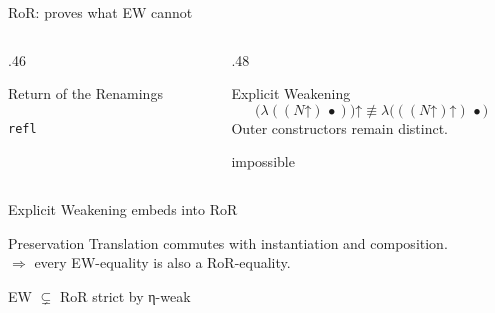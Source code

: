 \documentclass[pdftex,aspectratio=169]{beamer}
\newcommand{\refl}{\texttt{refl}}
\newcommand{\Blob}{\ensuremath{\bullet}}
\newcommand{\Wk}{\ensuremath{\mathord{\uparrow}}}
\begin{document}
\begin{frame}{RoR: proves what EW cannot}
  \begin{columns}[T,onlytextwidth]
    \begin{column}{.46\textwidth}
      \begin{block}{Return of the Renamings}
        \small
          \RoRWeakeningEta
      \end{block}
      \centering
      \Large\textcolor{alu-green}{\refl}
    \end{column}
    \begin{column}{.48\textwidth}
      \begin{alertblock}{Explicit Weakening}
        \[
        \bigl(\lambda((N\Wk)\,\Blob)\bigr)\Wk
        \not\equiv
        \lambda\bigl(((N\Wk)\Wk)\,\Blob\bigr)
        \]
        \small Outer constructors remain distinct.
      \end{alertblock}
      \centering
      \Large\textcolor{alu-red}{impossible}
    \end{column}
  \end{columns}

  \vspace{.75em}
\end{frame}

\begin{frame}{Explicit Weakening embeds into RoR}
  \begin{center}
  \end{center}

  \vspace{1em}
  \begin{block}{Preservation}
    Translation commutes with instantiation and composition. \\
    $\Rightarrow$ every
    EW-equality is also a RoR-equality.
  \end{block}

  \vspace{.55em}
  \begin{center}
    \Large EW \(\subsetneq\) RoR
    \qquad
    \normalsize strict by η-weak
  \end{center}
\end{frame}
\end{document}
